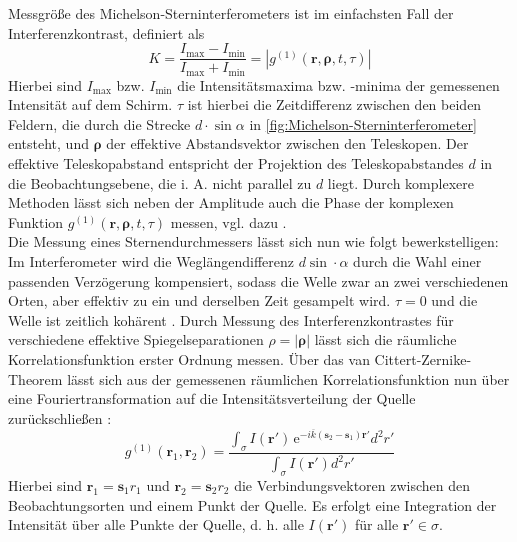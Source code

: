 Messgröße des Michelson-Sterninterferometers ist im einfachsten Fall der Interferenzkontrast, definiert als \cite{foellmiIntensityInterferometrySecondorder2009}
\begin{equation}
    K = \frac{I_{\mathrm{max}}-I_{\mathrm{min}}}{I_{\mathrm{max}}+I_{\mathrm{min}}}=\left|g^{(1)}(\mathbf{r}, \bm{\rho}, t, \tau)\right|
\end{equation} 
Hierbei sind $I_{\mathrm{max}}$ bzw. $I_{\mathrm{min}}$ die Intensitätsmaxima bzw. -minima der gemessenen Intensität auf dem Schirm. 
$\tau$ ist hierbei die Zeitdifferenz zwischen den beiden Feldern, die durch die Strecke $d\cdot\sin \alpha$ in \autoref{fig:Michelson-Sterninterferometer} entsteht, und $\bm{\rho}$ der effektive Abstandsvektor zwischen den Teleskopen. 
Der effektive Teleskopabstand entspricht der Projektion des Teleskopabstandes $d$ in die Beobachtungsebene, die i. A. nicht parallel zu $d$ liegt. 
Durch komplexere Methoden lässt sich neben der Amplitude auch die Phase der komplexen Funktion $g^{(1)}(\mathbf{r}, \bm{\rho}, t, \tau)$ messen, vgl. dazu \cite[Kap. 4.3]{mandelOpticalCoherenceQuantum1995}. \\
Die Messung eines Sternendurchmessers lässt sich nun wie folgt bewerkstelligen:
Im Interferometer wird die Weglängendifferenz $d \sin \cdot\alpha$ durch die Wahl einer passenden Verzögerung kompensiert, sodass die Welle zwar an zwei verschiedenen Orten, aber effektiv zu ein und derselben Zeit gesampelt wird. 
$\tau=0$ und die Welle ist zeitlich kohärent \cite{foellmiIntensityInterferometrySecondorder2009}. 
Durch Messung des Interferenzkontrastes für verschiedene effektive Spiegelseparationen $\rho=|\bm{\rho}|$ lässt sich die räumliche Korrelationsfunktion erster Ordnung messen. 
Über das van Cittert-Zernike-Theorem lässt sich aus der gemessenen räumlichen Korrelationsfunktion nun über eine Fouriertransformation auf die Intensitätsverteilung der Quelle zurückschließen \cite[eq. 4.4-40]{mandelOpticalCoherenceQuantum1995}:
\begin{equation}
    g^{(1)}(\bm{r}_1, \bm{r}_2) = \frac{\int_\sigma I(\bm{r}') \,\mathrm{e}^{-i\overline{k}\left(\bm{s}_2 - \bm{s}_1\right) \bm{r}'} d^2r'}{\int_\sigma I \left(\bm{r}'\right) d^2 r'}
    \label{eq:van Cittert-Zernike}
\end{equation}
Hierbei sind $\bm{r}_1=\bm{s}_1 r_1$ und $\bm{r}_2=\bm{s}_2 r_2$ die Verbindungsvektoren zwischen den Beobachtungsorten und einem Punkt der Quelle. 
Es erfolgt eine Integration der Intensität über alle Punkte der Quelle, d. h. alle $I\left(\bm{r}'\right)$ für alle $\bm{r}'\in \sigma$. 
